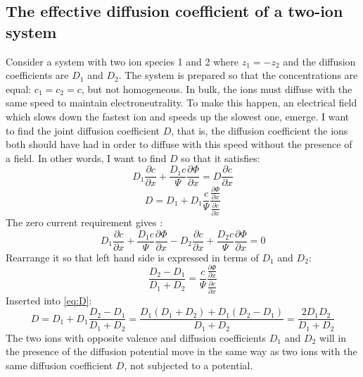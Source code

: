 \documentclass{uiophd}
\begin{document}
\subsection{The effective diffusion coefficient of a two-ion system}\label{joint diffusion}
Consider  a system with two ion species 1 and 2 where $z_1 = -z_2$ and the diffusion coefficients are $D_1$ and $D_2$. The system is prepared so that the concentrations are equal: $c_1 = c_2=c$, but not homogeneous. In bulk, the ions must diffuse with the same speed to maintain electroneutrality. To make this happen, an electrical field which slows down the fastest ion and speeds up the slowest one, emerge.  I want to find the joint diffusion coefficient $D$, that is, the diffusion coefficient the ions both should have had in order to diffuse with this speed without the presence of a field. In other words, I want to find $D$ so that it satisfies:
\begin{equation}
D_1 \frac{\partial c}{\partial x} + \frac{D_1 c}{\Psi}\frac{\partial \Phi}{\partial x} = D\frac{\partial c}{\partial x}
\end{equation} 
\begin{equation}\label{eq:D}
D = D_1 + D_1 \frac{c}{\Psi}\frac{\frac{\partial \Phi}{\partial x}}{\frac{\partial c}{\partial x}}
\end{equation}
The zero current requirement gives :
\begin{equation}
D_1 \frac{\partial c}{\partial x} + \frac{D_1 c}{\Psi}\frac{\partial \Phi}{\partial x} - D_2 \frac{\partial c}{\partial x} + \frac{D_2 c}{\Psi}\frac{\partial \Phi}{\partial x} = 0
\end{equation}
Rearrange it so that left hand side is expressed in terms of $D_1$ and $D_2$:
\begin{equation}
\frac{D_2 - D_1}{D_1 + D_2} = \frac{c}{\Psi}\frac{\frac{\partial \Phi}{\partial x}}{\frac{\partial c}{\partial x}}
\end{equation}
Inserted into \ref{eq:D}: 
\begin{equation}
D = D_1 +D_1 \frac{D_2 - D_1}{D_1 + D_2} = \frac{D_1(D_1 + D_2)+D_1(D_2-D_1)}{D_1+D_2} = \frac{2D_1D_2}{D_1+D_2}
\end{equation}
The two ions with opposite valence and diffusion coefficients $D_1$ and $D_2$ will in the presence of the diffusion potential move in the same way as two ions with the same diffusion coefficient $D$, not subjected to a potential. 
\end{document}
